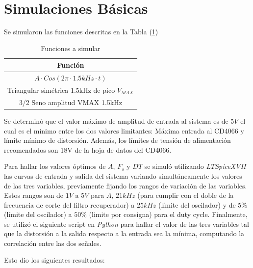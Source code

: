 


\section{Simulaciones Básicas}

Se simularon las funciones descritas en la Tabla (\ref{fn})

\begin{table}[H]
\centering
\begin{tabular}{@{}c@{}}
\toprule
Función \\ \midrule
$A\cdot Cos(2\pi \cdot 1.5kHz \cdot t)$ \\
Triangular simétrica 1.5kHz de pico $V_{MAX}$ \\
3/2 Seno amplitud VMAX 1.5kHz \\ \bottomrule
\end{tabular}
\caption{Funciones a simular}
\label{fn}
\end{table}

Se determinó que el valor máximo de amplitud de entrada al sistema es de $5V$ el cual es el mínimo entre los dos valores limitantes: Máxima entrada al CD4066 y límite mínimo de distorsión. Además, los límites de tensión de alimentación recomendados son 18V de la hoja de datos del CD4066.

Para hallar los valores óptimos de $A$, $F_s$ y $DT$ se simuló utilizando \textit{LTSpiceXVII} las curvas de entrada y salida del sistema variando simultáneamente los valores de las tres variables, previamente fijando los rangos de variación de las variables. Estos rangos son de $1V$ a $5V$ para $A$,
 $21kHz$ (para cumplir con el doble de la frecuencia de corte del filtro recuperador) a $25kHz$ (límite del oscilador) y de $5\%$ (límite del oscilador) a $50\%$ (limite por consigna) para el duty cycle. Finalmente, se utilizó el siguiente script en \textit{Python} para hallar el valor de las tres variables tal que la distorsión a la salida respecto a la entrada sea la mínima, computando la correlación entre las dos señales.



Esto dio los siguientes resultados:

